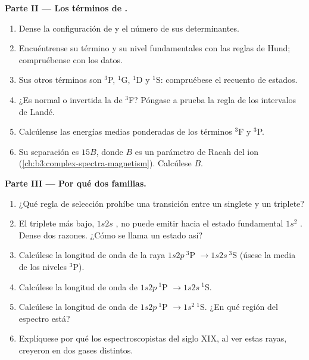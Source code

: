 \begin{problem}
\medskip\noindent\textbf{Parte II --- Los términos de .}
\begin{enumerate}[resume]
  \item Dense la configuración de  y el número de sus
        determinantes.
  \item Encuéntrense su término y su nivel fundamentales con las reglas de Hund; compruébense con los
        datos.
  \item Sus otros términos son ${}^3$P, ${}^1$G, ${}^1$D y ${}^1$S: compruébese el recuento de
        estados.
  \item ¿Es normal o invertida la  de ${}^3$F? Póngase a prueba la regla de los
        intervalos de Landé.
  \item Calcúlense las energías medias ponderadas de los términos ${}^3$F y ${}^3$P.
  \item Su separación es $15B$, donde $B$ es un parámetro de Racah del
        ion (\cref{ch:b3:complex-spectra-magnetism}). Calcúlese $B$.
\end{enumerate}

\medskip\noindent\textbf{Parte III --- Por qué dos familias.}
\begin{enumerate}[resume]
  \item ¿Qué regla de selección prohíbe una transición entre un singlete y un
        triplete?
  \item El triplete más bajo, $1s2s$ , no puede emitir hacia el estado
        fundamental $1s^2$ . Dense dos razones. ¿Cómo se llama un estado
        así?
  \item Calcúlese la longitud de onda de la raya $1s2p\ {}^3$P $\to 1s2s\ {}^3$S (úsese
        la media de los niveles ${}^3$P).
  \item Calcúlese la longitud de onda de $1s2p\ {}^1$P $\to 1s2s\ {}^1$S.
  \item Calcúlese la longitud de onda de $1s2p\ {}^1$P $\to 1s^2\ {}^1$S. ¿En qué
        región del espectro está?
  \item Explíquese por qué los espectroscopistas del siglo XIX, al ver estas rayas,
        creyeron en dos gases distintos.
\end{enumerate}


\end{problem}
